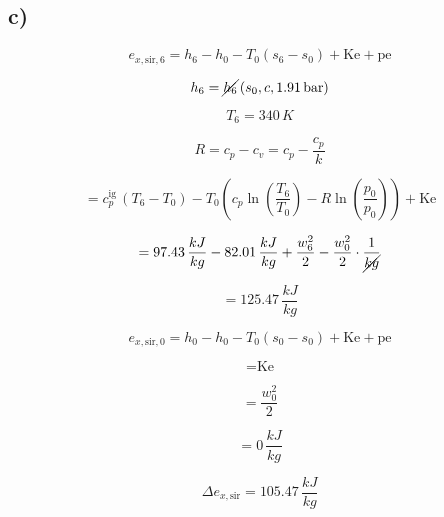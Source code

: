 

\subsection*{c)}

\[
e_{x,\text{sir},6} = h_6 - h_0 - T_0 (s_6 - s_0) + \text{Ke} + \text{pe}
\]

\[
h_6 = \cancel{h_6} \, (s_0, c, 1.91 \, \text{bar})
\]

\[
T_6 = 340 \, K
\]

\[
R = c_p - c_v = c_p - \frac{c_p}{k}
\]

\[
= c_p^{\text{ig}} \, (T_6 - T_0) - T_0 \left( c_p \ln \left( \frac{T_6}{T_0} \right) - R \ln \left( \frac{p_0}{p_0} \right) \right) + \text{Ke}
\]

\[
= 97.43 \, \frac{kJ}{kg} - 82.01 \, \frac{kJ}{kg} + \frac{w_6^2}{2} - \frac{w_0^2}{2} \cdot \frac{1}{\cancel{kg}}
\]

\[
= 125.47 \, \frac{kJ}{kg}
\]

\[
e_{x,\text{sir},0} = h_0 - h_0 - T_0 (s_0 - s_0) + \text{Ke} + \text{pe}
\]

\[
= \text{Ke}
\]

\[
= \frac{w_0^2}{2}
\]

\[
= 0 \, \frac{kJ}{kg}
\]

\[
\Delta e_{x,\text{sir}} = 105.47 \, \frac{kJ}{kg}
\]